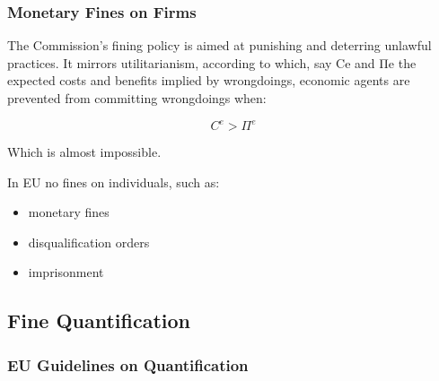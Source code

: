         \subsubsection{Monetary Fines on Firms}

            The Commission's fining policy is aimed at punishing and deterring unlawful practices. It mirrors utilitarianism, according to which, say Ce and Πe the expected costs and benefits implied by wrongdoings, economic agents are prevented from committing wrongdoings when:
            
            \begin{equation}
                C^e > \Pi^e
            \end{equation}
            
            Which is almost impossible.
            

            In EU no fines on individuals, such as:
            \begin{itemize}
                \item  monetary fines
                \item disqualification orders
                \item imprisonment
            \end{itemize}

\newpage
            
    \subsection{Fine Quantification}

        \subsubsection{EU Guidelines on Quantification}

